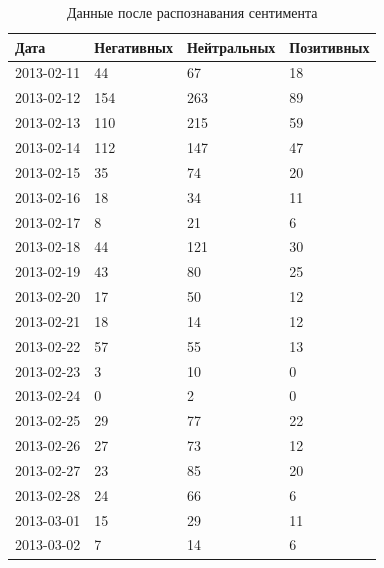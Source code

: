 \documentclass{article}
\begin{document}
\begin{table}[!h]
	\caption{Данные после распознавания сентимента}
	\label{tab:table5}
	\centering
	\begin{tabular}{llll}
		\toprule
		Дата & Негативных & Нейтральных & Позитивных \\
		\midrule
		2013-02-11 & 44 & 67 & 18  \\ 
		2013-02-12 & 154 & 263 & 89  \\ 
		2013-02-13 & 110 & 215 & 59  \\ 
		2013-02-14 & 112 & 147 & 47  \\ 
		2013-02-15 & 35 & 74 & 20  \\ 
		2013-02-16 & 18 & 34 & 11  \\ 
		2013-02-17 & 8 & 21 & 6  \\ 
		2013-02-18 & 44 & 121 & 30  \\ 
		2013-02-19 & 43 & 80 & 25  \\ 
		2013-02-20 & 17 & 50 & 12  \\ 
		2013-02-21 & 18 & 14 & 12  \\ 
		2013-02-22 & 57 & 55 & 13  \\ 
		2013-02-23 & 3 & 10 & 0  \\ 
		2013-02-24 & 0 & 2 & 0  \\ 
		2013-02-25 & 29 & 77 & 22  \\ 
		2013-02-26 & 27 & 73 & 12  \\ 
		2013-02-27 & 23 & 85 & 20  \\ 
		2013-02-28 & 24 & 66 & 6  \\ 
		2013-03-01 & 15 & 29 & 11  \\ 
		2013-03-02 & 7 & 14 & 6  \\ 
		\bottomrule
	\end{tabular}
\end{table}
\end{document}
